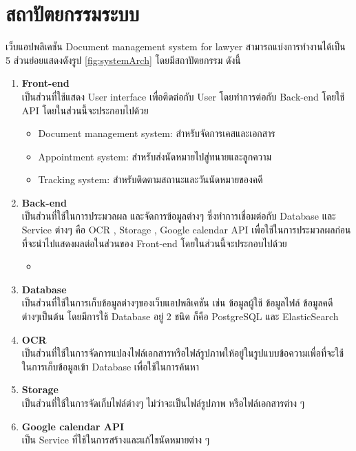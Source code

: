 \documentclass[12pt,oneside,openright,a4paper]{cpe-thai-project}
\begin{document}
\section{สถาปัตยกรรมระบบ}
\hspace*{1cm} เว็บแอปพลิเคชัน Document management system for lawyer สามารถแบ่งการทำงานได้เป็น 5 ส่วนย่อยแสดงดังรูป \ref{fig:systemArch} โดยมีสถาปัตยกรรม ดังนี้
\begin{enumerate}
  \item \textbf{Front-end} \\
  \hspace*{1cm} เป็นส่วนที่ใช้แสดง User interface เพื่อติดต่อกับ User โดยทำการต่อกับ Back-end โดยใช้ API โดยในส่วนนี้จะประกอบไปด้วย
  \begin{itemize}
    \item Document management system: สำหรับจัดการเคสและเอกสาร
    \item Appointment system: สำหรับส่งนัดหมายไปสู่ทนายและลูกความ
    \item Tracking system: สำหรับติดตามสถานะและวันนัดหมายของคดี
  \end{itemize}
  \item \textbf{Back-end} \\
  \hspace*{1cm} เป็นส่วนที่ใช้ในการประมวลผล และจัดการข้อมูลต่างๆ ซึ่งทำการเชื่อมต่อกับ Database และ Service ต่างๆ คือ OCR , Storage , Google calendar API เพื่อใช้ในการประมวลผลก่อนที่จะนำไปแสดงผลต่อในส่วนของ Front-end โดยในส่วนนี้จะประกอบไปด้วย
  \begin{itemize}
    \item 
  \end{itemize}
  \item \textbf{Database} \\
  \hspace*{1cm} เป็นส่วนที่ใช้ในการเก็บข้อมูลต่างๆของเว็บแอปพลิเคชัน เช่น ข้อมูลผู้ใช้ ข้อมูลไฟล์ ข้อมูลคดี ต่างๆเป็นต้น โดยมีการใช้ Database อยู่ 2 ชนิด ก็คือ PostgreSQL และ ElasticSearch \cite{WhatIsElasticsearch, ElasticsearchForSearchEngine}
  \item \textbf{OCR} \\
  \hspace*{1cm} เป็นส่วนที่ใช้ในการจัดการแปลงไฟล์เอกสารหรือไฟล์รูปภาพให้อยู่ในรูปแบบข้อความเพื่อที่จะใช้ในการเก็บข้อมูลเข้า Database เพื่อใช้ในการค้นหา
  \item \textbf{Storage} \\
  \hspace*{1cm} เป็นส่วนที่ใช้ในการจัดเก็บไฟล์ต่างๆ ไม่ว่าจะเป็นไฟล์รูปภาพ หรือไฟล์เอกสารต่าง ๆ 
  \item \textbf{Google calendar API} \\
  \hspace*{1cm} เป็น Service ที่ใช้ในการสร้างและแก้ไขนัดหมายต่าง ๆ
\end{enumerate}
\end{document}
